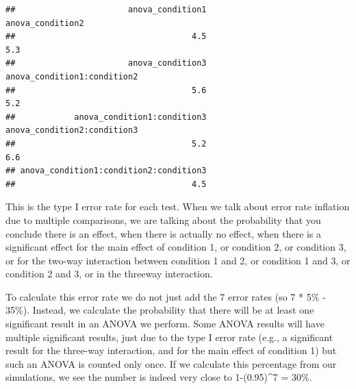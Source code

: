 \documentclass[
]{book}
\newenvironment{Shaded}{\begin{snugshade}}{\end{snugshade}}
\newcommand{\ControlFlowTok}[1]{\textcolor[rgb]{0.13,0.29,0.53}{\textbf{#1}}}
\newcommand{\DecValTok}[1]{\textcolor[rgb]{0.00,0.00,0.81}{#1}}
\newcommand{\FloatTok}[1]{\textcolor[rgb]{0.00,0.00,0.81}{#1}}
\newcommand{\KeywordTok}[1]{\textcolor[rgb]{0.13,0.29,0.53}{\textbf{#1}}}
\newcommand{\NormalTok}[1]{#1}
\newcommand{\OperatorTok}[1]{\textcolor[rgb]{0.81,0.36,0.00}{\textbf{#1}}}
\newcommand{\StringTok}[1]{\textcolor[rgb]{0.31,0.60,0.02}{#1}}
\begin{document}
\begin{Shaded}
\end{Shaded}

\begin{verbatim}
##                       anova_condition1                       anova_condition2 
##                                    4.5                                    5.3 
##                       anova_condition3            anova_condition1:condition2 
##                                    5.6                                    5.2 
##            anova_condition1:condition3            anova_condition2:condition3 
##                                    5.2                                    6.6 
## anova_condition1:condition2:condition3 
##                                    4.5
\end{verbatim}

This is the type I error rate for each test. When we talk about error rate inflation due to multiple comparisons, we are talking about the probability that you conclude there is an effect, when there is actually no effect, when there is a significant effect for the main effect of condition 1, or condition 2, or condition 3, or for the two-way interaction between condition 1 and 2, or condition 1 and 3, or condition 2 and 3, or in the threeway interaction.

To calculate this error rate we do not just add the 7 error rates (so 7 * 5\% - 35\%). Instead, we calculate the probability that there will be at least one significant result in an ANOVA we perform. Some ANOVA results will have multiple significant results, just due to the type I error rate (e.g., a significant result for the three-way interaction, and for the main effect of condition 1) but such an ANOVA is counted only once. If we calculate this percentage from our simulations, we see the number is indeed very close to 1-(0.95)\^{}7 = 30\%.
\end{document}
